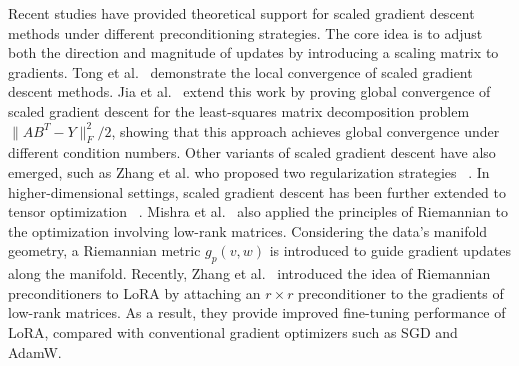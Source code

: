 Recent studies have provided theoretical support for scaled gradient descent methods under different preconditioning strategies. The core idea is to adjust both the direction and magnitude of updates by introducing a scaling matrix to gradients.  
Tong et al.~\cite{tong2021low} demonstrate the local convergence of scaled gradient descent methods. Jia et al.~\cite{jia2024preconditioning} extend this work by proving global convergence of scaled gradient descent for the least-squares matrix decomposition problem \( \|AB^T - Y\|_F^2 / 2 \), showing that this approach achieves global convergence under different condition numbers. Other variants of scaled gradient descent have also emerged, such as Zhang et al. who proposed two regularization strategies ~\cite{zhang2023preconditioned,zhang2024fast}. In higher-dimensional settings, scaled gradient descent has been further extended to tensor optimization ~\cite{tong2022scaling,ma2023provably}. Mishra et al.~\cite{mishra2013low, mishra2016riemannian} also applied the principles of Riemannian to the optimization involving low-rank matrices. Considering the data's manifold geometry, a Riemannian metric $g_p(v, w)$ is introduced to guide gradient updates along the manifold. Recently, Zhang et al.~\cite{riemannian} introduced the idea of Riemannian preconditioners to LoRA by attaching an \( r \times r \) preconditioner to the gradients of low-rank matrices. As a result, they provide improved fine-tuning performance of LoRA, compared with conventional gradient optimizers such as SGD and AdamW.